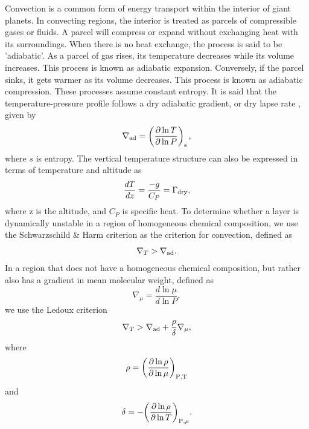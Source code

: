\documentclass[11pt]{ucscthesisbs}
\begin{document}
Convection is a common form of energy transport within the interior of giant planets. In convecting regions, the interior is treated as parcels of compressible gases or fluids. A parcel will compress or expand without exchanging heat with its surroundings. When there is no heat exchange, the process is said to be 'adiabatic'. As a parcel of gas rises, its temperature decreases while its volume increases. This process is known as adiabatic expansion. Conversely, if the parcel sinks, it gets warmer as its volume decreases. This process is known as adiabatic compression. These processes assume constant entropy. It is said that the temperature-pressure profile follows a dry adiabatic gradient, or dry lapse rate \citep{kippenhahn_2012}, given by
\begin{equation}
  \nabla_{\rm ad} = \left( \frac{\partial \ln T}{\partial \ln P} \right)_{\rm s},
\end{equation}
where $s$ is entropy. The vertical temperature structure can also be expressed in terms of temperature and altitude \citep{sanchez-lavega} as
\begin{equation}
  \frac{dT}{dz} = \frac{-g}{C_{P}} = \Gamma_{\rm dry},
\end{equation}
where z is the altitude, and $C_{P}$ is specific heat. To determine whether a layer is dynamically unstable in a region of homogeneous chemical composition, we use the Schwarzschild \& Harm criterion \citep{kippenhahn_2012} as the criterion for convection, defined as
 \begin{equation}
  \nabla_{T} > \nabla_{\rm ad}.
\end{equation}
In a region that does not have a homogeneous chemical composition, but rather also has a gradient in mean molecular weight, defined as
 \begin{equation}
 \nabla_{\mu} = \frac{d \ln \mu}{d \ln P}, 
\end{equation}
 we use the Ledoux criterion\citep{kippenhahn_2012}
\begin{equation}
  \nabla_{T} > \nabla_{\rm ad} + \frac{\rho}{\delta}\nabla_{\mu},
  \label{eq:ledoux}
\end{equation}
where
\begin{equation}
  \rho = \bigg(\frac{\partial \ln \rho}{\partial \ln \mu}\bigg)_{\rm P,T}
\end{equation}
and
\begin{equation}
 \delta = -\bigg(\frac{\partial \ln \rho}{\partial \ln T}\bigg)_{\rm P,\mu}.
\end{equation}
\end{document}
